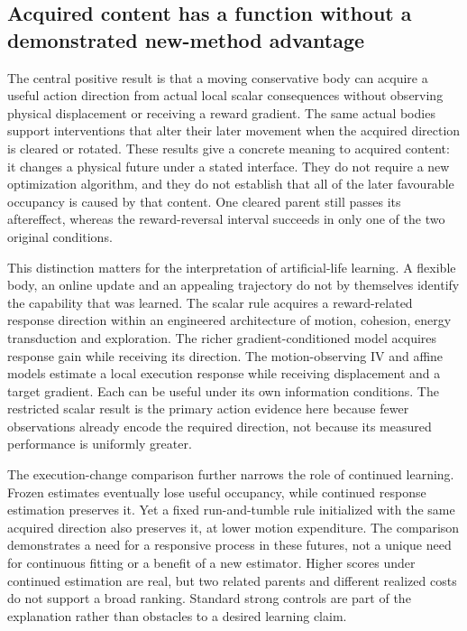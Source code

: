 \subsection*{Acquired content has a function without a demonstrated new-method advantage}

The central positive result is that a moving conservative body can acquire a useful action direction from actual local scalar consequences without observing physical displacement or receiving a reward gradient. The same actual bodies support interventions that alter their later movement when the acquired direction is cleared or rotated. These results give a concrete meaning to acquired content: it changes a physical future under a stated interface. They do not require a new optimization algorithm, and they do not establish that all of the later favourable occupancy is caused by that content. One cleared parent still passes its aftereffect, whereas the reward-reversal interval succeeds in only one of the two original conditions.

This distinction matters for the interpretation of artificial-life learning. A flexible body, an online update and an appealing trajectory do not by themselves identify the capability that was learned. The scalar rule acquires a reward-related response direction within an engineered architecture of motion, cohesion, energy transduction and exploration. The richer gradient-conditioned model acquires response gain while receiving its direction. The motion-observing IV and affine models estimate a local execution response while receiving displacement and a target gradient. Each can be useful under its own information conditions. The restricted scalar result is the primary action evidence here because fewer observations already encode the required direction, not because its measured performance is uniformly greater.

The execution-change comparison further narrows the role of continued learning. Frozen estimates eventually lose useful occupancy, while continued response estimation preserves it. Yet a fixed run-and-tumble rule initialized with the same acquired direction also preserves it, at lower motion expenditure. The comparison demonstrates a need for a responsive process in these futures, not a unique need for continuous fitting or a benefit of a new estimator. Higher scores under continued estimation are real, but two related parents and different realized costs do not support a broad ranking. Standard strong controls are part of the explanation rather than obstacles to a desired learning claim.

